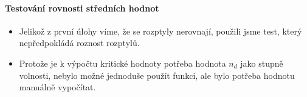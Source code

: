 \documentclass[11pt]{article}
\providecommand{\tightlist}{%
      \setlength{\itemsep}{0pt}\setlength{\parskip}{0pt}}
\begin{document}
\hypertarget{testovuxe1nuxed-rovnosti-stux159ednuxedch-hodnot}{%
\paragraph{Testování rovnosti středních
hodnot}\label{testovuxe1nuxed-rovnosti-stux159ednuxedch-hodnot}}

\begin{itemize}
\tightlist
\item
  Jelikož z první úlohy víme, že se rozptyly nerovnají, použili jsme
  test, který nepředpokládá roznost rozptylů.
\item
  Protože je k výpočtu kritické hodnoty potřeba hodnota \(n_d\) jako
  stupně volnosti, nebylo možné jednoduše použít funkci, ale bylo
  potřeba hodnotu manuálně vypočítat.
\end{itemize}
\end{document}

